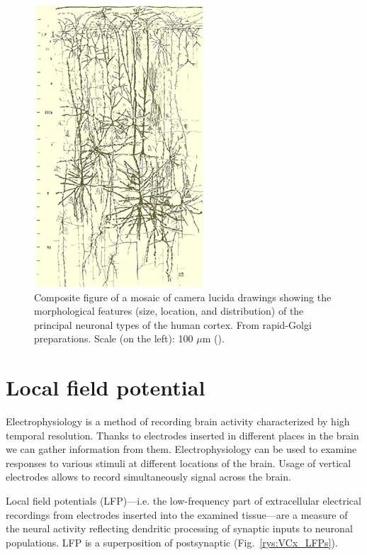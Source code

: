 \documentclass{pracalicmgr}
\begin{document}
   \begin{figure}[H]
   	\begin{center}
   		\includegraphics[scale=1]{morphology_neurons.png}
   	\end{center}
   	\caption{Composite figure of a mosaic of camera lucida drawings showing the morphological features (size, location, and distribution) of the principal neuronal types of the human cortex. From rapid-Golgi preparations. Scale (on the left): 100 $\mu$m  (\cite{morphology}).}
   	\label{rys:morphology_neurons}
   \end{figure}   
   
   
   \section{Local field potential}
   Electrophysiology is a method of recording brain activity characterized by high temporal resolution. Thanks to electrodes inserted in different places in the brain we can gather information from them. Electrophysiology can be used to examine responses to various stimuli at different locations of the brain. Usage of vertical electrodes allows to record simultaneously signal across the brain.
   
   Local field potentials (LFP)---i.e. the low-frequency part of extracellular electrical
   recordings from electrodes inserted into the examined tissue---are a measure of the neural activity reflecting dendritic processing of synaptic inputs to neuronal populations. LFP is a superposition of postsynaptic (Fig.~\ref{rys:VCx_LFPs}).
   
\end{document}
